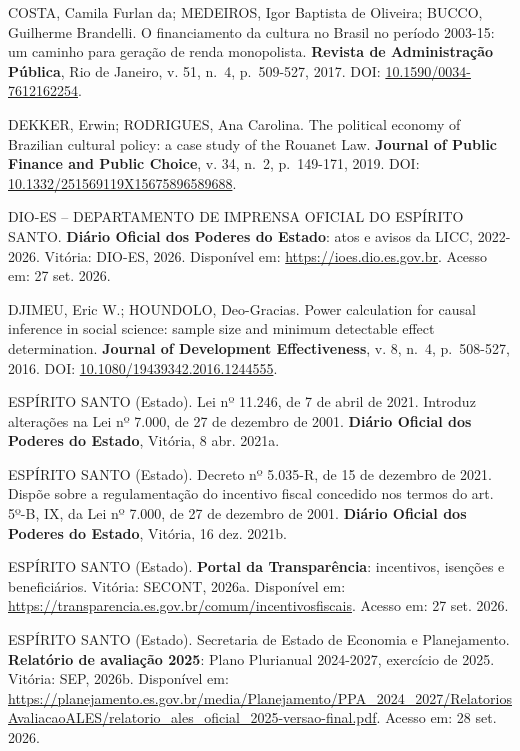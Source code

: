 \documentclass[12pt,a4paper]{article}
\newenvironment{referencias}{\raggedright\setlength{\parindent}{0pt}\setlength{\parskip}{0.5\baselineskip}}{\par}
\begin{document}
\begin{referencias}
\protect{}\label{ref-costa-8}{}COSTA, Camila Furlan da; MEDEIROS, Igor Baptista de
Oliveira; BUCCO, Guilherme Brandelli. O financiamento da cultura no Brasil no período 2003-15: um
caminho para geração de renda monopolista. \textbf{Revista de Administração Pública}, Rio de
Janeiro, v. 51, n.~4, p.~509-527, 2017. DOI:
\href{https://doi.org/10.1590/0034-7612162254}{10.1590/0034-7612162254}.

\protect{}\label{ref-dekker-9}{}DEKKER, Erwin; RODRIGUES, Ana Carolina. The political
economy of Brazilian cultural policy: a case study of the Rouanet Law. \textbf{Journal of Public
Finance and Public Choice}, v. 34, n.~2, p.~149-171, 2019. DOI:
\href{https://doi.org/10.1332/251569119X15675896589688}{10.1332/251569119X15675896589688}.

\protect{}\label{ref-dio-es-10}{}DIO-ES -- DEPARTAMENTO DE IMPRENSA OFICIAL DO ESPÍRITO
SANTO. \textbf{Diário Oficial dos Poderes do Estado}: atos e avisos da LICC, 2022-2026. Vitória:
DIO-ES, 2026. Disponível em: \url{https://ioes.dio.es.gov.br}. Acesso em: 27 set. 2026.

\protect{}\label{ref-djimeu-11}{}DJIMEU, Eric W.; HOUNDOLO, Deo-Gracias. Power
calculation for causal inference in social science: sample size and minimum detectable effect
determination. \textbf{Journal of Development Effectiveness}, v. 8, n.~4, p.~508-527, 2016. DOI:
\href{https://doi.org/10.1080/19439342.2016.1244555}{10.1080/19439342.2016.1244555}.

\protect{}\label{ref-espirito-12}{}ESPÍRITO SANTO (Estado). Lei nº 11.246, de 7 de
abril de 2021. Introduz alterações na Lei nº 7.000, de 27 de dezembro de 2001. \textbf{Diário
Oficial dos Poderes do Estado}, Vitória, 8 abr. 2021a.

\protect{}\label{ref-espirito-13}{}ESPÍRITO SANTO (Estado). Decreto nº 5.035-R, de 15
de dezembro de 2021. Dispõe sobre a regulamentação do incentivo fiscal concedido nos termos do art.
5º-B, IX, da Lei nº 7.000, de 27 de dezembro de 2001. \textbf{Diário Oficial dos Poderes do Estado},
Vitória, 16 dez. 2021b.

\protect{}\label{ref-espirito-14}{}ESPÍRITO SANTO (Estado). \textbf{Portal da
Transparência}: incentivos, isenções e beneficiários. Vitória: SECONT, 2026a. Disponível em:
\url{https://transparencia.es.gov.br/comum/incentivosfiscais}. Acesso em: 27 set. 2026.

\protect{}\label{ref-espirito-15}{}ESPÍRITO SANTO (Estado). Secretaria de Estado de
Economia e Planejamento. \textbf{Relatório de avaliação 2025}: Plano Plurianual 2024-2027, exercício
de 2025. Vitória: SEP, 2026b. Disponível em:
\url{https://planejamento.es.gov.br/media/Planejamento/PPA_2024_2027/RelatoriosAvaliacaoALES/relatorio_ales_oficial_2025-versao-final.pdf}.
Acesso em: 28 set. 2026.


\end{referencias}
\end{document}
